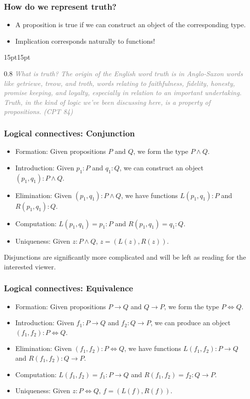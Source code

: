 \documentclass{beamer}
\providecommand{\ii}{\item}
\begin{document}
\begin{frame}\frametitle{How do we represent truth?}
	\begin{itemize}
		\ii A proposition is true if we can construct
		an object of the corresponding type.
		\ii Implication corresponds naturally to functions!
	\end{itemize}
	
	\begin{adjustwidth}{15pt}{15pt}
		\begin{spacing}{0.8}
			\textit{\textcolor{gray}{\scriptsize
			What is truth? The origin of the English word truth is in Anglo-Saxon words like getriewe, treow, and troth, words relating to faithfulness, fidelity, honesty, promise keeping, and loyalty, especially in relation to an important undertaking. Truth, in the kind of logic we’ve been discussing here, is a property of propositions. (CPT 84)
			}}
		\end{spacing}
	\end{adjustwidth}
\end{frame}

\begin{frame}\frametitle{Logical connectives: Conjunction}
	\begin{itemize}
		\ii Formation: Given propositions $P$ and $Q$,
		we form the type $P\land Q$.
		\ii Introduction: Given $p_1 : P$ and $q_1 : Q$,
		we can construct an object $(p_1, q_1) : P\land Q$.
		\ii Elimination: Given $(p_1, q_1):P\land Q$, we have functions
		$L(p_1, q_1) : P$
		and $R(p_1, q_1) : Q$.
		\ii Computation: $L(p_1, q_1) = p_1 : P$
		and $R(p_1, q_1) = q_1 : Q$.
		\ii Uniqueness: Given $z : P\land Q$,
		$z = (L(z), R(z))$.
	\end{itemize}

	Disjunctions are significantly more complicated
	and will be left as reading for the interested viewer.
\end{frame}

\begin{frame}\frametitle{Logical connectives: Equivalence}
	\begin{itemize}
		\ii Formation: Given propositions $P\to Q$ and $Q\to P$,
		we form the type $P\iff Q$.
		\ii Introduction: Given $f_1 : P\to Q$
		and $f_2 : Q\to P$, we can produce an object $(f_1, f_2) : P\iff Q$.
		\ii Elimination: Given $(f_1, f_2):P\iff Q$, we have functions
		$L(f_1, f_2) : P\to Q$
		and $R(f_1, f_2) : Q\to P$.
		\ii Computation: $L(f_1, f_2) = f_1 : P\to Q$
		and $R(f_1, f_2) = f_2 : Q\to P$.
		\ii Uniqueness: Given $z : P\iff Q$,
		$f = (L(f), R(f))$.
	\end{itemize}
\end{frame}
\end{document}
